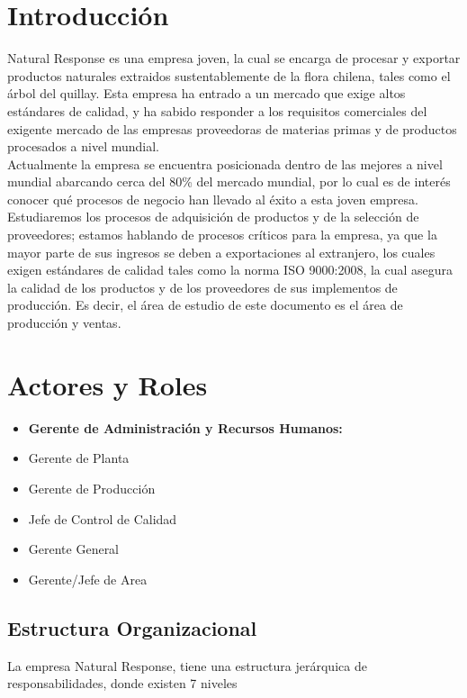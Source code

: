 \documentclass[12pt,letterpaper]{article}
\begin{document}
\section{Introducción}
Natural Response es una empresa joven, la cual se encarga de procesar y exportar productos naturales extraidos sustentablemente de la flora chilena, tales como el árbol del quillay. Esta empresa ha entrado a un mercado que exige altos estándares de calidad, y ha sabido responder a los requisitos comerciales del exigente mercado de las empresas proveedoras de materias primas y de productos procesados a nivel mundial.\\
Actualmente la empresa se encuentra posicionada dentro de las mejores a nivel mundial abarcando cerca del 80\% del mercado mundial, por lo cual es de interés conocer qué procesos de negocio han llevado al éxito a esta joven empresa. Estudiaremos los procesos de adquisición de productos y de la selección de proveedores; estamos hablando de procesos críticos para la empresa, ya que la mayor parte de sus ingresos se deben a exportaciones al extranjero, los cuales exigen estándares de calidad tales como la norma ISO 9000:2008, la cual asegura la calidad de los productos y de los proveedores de sus implementos de producción. Es decir, el área de estudio de este documento es el área de producción y ventas.\\

\section{Actores y Roles}
\begin{itemize}
\item{\textbf{Gerente de Administración y Recursos Humanos:}} 
\item{Gerente de Planta}
\item{Gerente de Producción}
\item{Jefe de Control de Calidad}
\item{Gerente General}
\item{Gerente/Jefe de Area}
\end{itemize}

\subsection{Estructura Organizacional}
La empresa Natural Response, tiene una estructura jerárquica de responsabilidades, donde existen 7 niveles
\end{document}
